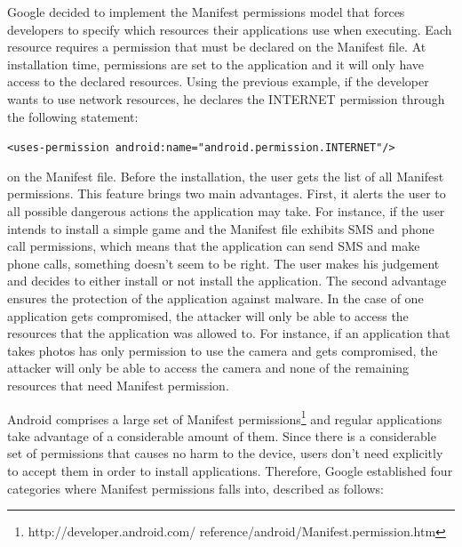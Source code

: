 Google decided to implement the Manifest permissions model that forces developers to specify which resources their applications use when executing. Each resource requires a permission that must be declared on the Manifest file. At installation time, permissions are set to the application and it will only have access to the declared resources. Using the previous example, if the developer wants to use network resources, he declares the INTERNET permission through the following statement:

\noindent \texttt{<uses-permission android:name="android.permission.INTERNET"/>}

\noindent on the Manifest file. Before the installation, the user gets the list of all Manifest permissions. This feature brings two main advantages. First, it alerts the user to all possible dangerous actions the application may take. For instance, if the user intends to install a simple game and the Manifest file exhibits SMS and phone call permissions, which means that the application can send SMS and make phone calls, something doesn't seem to be right. The user makes his judgement and decides to either install or not install the application. The second advantage ensures the protection of the application against malware. In the case of one application gets compromised, the attacker will only be able to access the resources that the application was allowed to. For instance, if an application that takes photos has only permission to use the camera and gets compromised, the attacker will only be able to access the camera and none of the remaining resources that need Manifest permission.


Android comprises a large set of Manifest permissions\footnote{http://developer.android.com/ reference/android/Manifest.permission.htm} and regular applications take advantage of a considerable amount of them. Since there is a considerable set of permissions that causes no harm to the device, users don't need explicitly to accept them in order to install applications. Therefore, Google established four categories where Manifest permissions falls into, described as follows:

